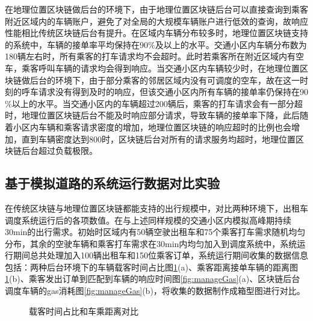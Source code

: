 ​在地理位置区块链做后台的环境下，由于地理位置区块链后台可以直接查询到乘客附近区域内的车辆账户，避免了对全局的大规模车辆账户进行低效的查询，故响应性能相比传统区块链后台有提升。在区域内车辆分布较多时，地理位置区块链支持的系统中，车辆的接单率平均保持在90$\%$及以上的水平。交通小区内车辆分布数为180辆左右时，所有乘客的打车请求均不会超时。此时若乘客所在附近区域内有空车，乘客呼叫车辆的请求均会得到响应。当交通小区内车辆较少时，在地理位置区块链做后台的环境下，由于部分乘客的邻居区域内没有可调度的空车，故在这一时刻的呼车请求没有得到及时的响应，但该交通小区内所有车辆的接单率仍保持在90$\%$以上的水平。当交通小区内的车辆超过200辆后，乘客的打车请求会有一部分超时，地理位置区块链后台不能及时响应部分请求，导致车辆的接单率下降，此后随着小区内车辆和乘客请求密度的增加，地理位置区块链的响应超时的比例也会增加，直到车辆密度达到800时，区块链后台对所有的请求服务均超时，地理位置区块链后台超过负载极限。

\subsection{基于模拟道路的系统运行数据对比实验}
在传统区块链与地理位置区块链都能支持的出行规模中，对比两种环境下，出租车调度系统运行后的各项数值。在与上述同样规模的交通小区内模拟高峰期持续30min的出行需求。初始时区域内有50辆空驶出租车和75个乘客打车需求随机均匀分布，其余的空驶车辆和乘客打车需求在30min内均匀加入到调度系统中，系统运行期间总共处理加入100辆出租车和150位乘客订单，系统运行期间收集的数据信息包括：两种后台环境下的车辆载客时间占比图\ref{fig:timeDistance}(a)、乘客距离接单车辆的距离图\ref{fig:timeDistance}(b)、乘客发出订单到匹配到车辆的响应时间图\ref{fig:manageGas}(a)、区块链后台调度车辆的gas消耗图\ref{fig:manageGas}(b)，将收集的数据制作成箱型图进行对比。

\begin{figure}[h]
  \centering
  \caption{载客时间占比和车乘距离对比}
  \label{fig:timeDistance}
\end{figure}

